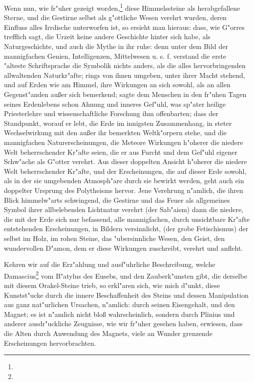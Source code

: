 \documentclass[a4paper, 11pt, oneside, polutonikogreek, german]{article}
\begin{document}
Wenn nun, wie fr"uher gezeigt worden,\footnote{} diese Himmelssteine als herabgefallene Sterne, und die Gestirne selbst als g"ottliche Wesen verehrt wurden, deren Einfluss alles Irrdische unterworfen ist, so ersieht man hieraus: dass, wie G"orres trefflich sagt, die Urzeit keine andere Geschichte hinter sich habe, als Naturgeschichte, und auch die Mythe in ihr ruhe: denn unter dem Bild der mannigfachen Genien, Intelligenzen, Mittelwesen u. s. f. verstand die erste "alteste Schriftsprache die Symbolik nichts anders, als die alles hervorbringenden allwaltenden Naturkr"afte; rings von ihnen umgeben, unter ihrer Macht stehend, und auf Erden wie am Himmel, ihre Wirkungen an sich sowohl, als an allen Gegenst"anden außer sich bemerkend; sagte dem Menschen in den fr"uhen Tagen seines Erdenlebens schon Ahnung und inneres Gef"uhl, was sp"ater heilige Priesterlehre und wissenschaftliche Forschung ihm offenbarten; dass der Standpunkt, worauf er lebt, die Erde im innigsten Zusammenhang, in steter Wechselwirkung mit den außer ihr bemerkten Weltk"orpern stehe, und die mannigfachen Naturerscheinungen, die Meteore Wirkungen h"oherer die niedere Welt beherrschender Kr"afte seien, die er aus Furcht und dem Gef"uhl eigener Schw"ache als G"otter verehrt. Aus dieser doppelten Ansicht h"oherer die niedere Welt beherrschender Kr"afte, und der Erscheinungen, die auf dieser Erde sowohl, als in der sie umgebenden Atmosph"are durch sie bewirkt werden, geht auch ein doppelter Ursprung des Polytheisms hervor. Jene Verehrung n"amlich, die ihren Blick himmelw"arts schwingend, die Gestirne und das Feuer als allgemeines Symbol ihrer allbelebenden Lichtnatur verehrt (der Sab"aism) dann die niedere, die mit der Erde sich nur befassend, alle mannigfachen, durch unsichtbare Kr"afte entstehenden Erscheinungen, in Bildern versinnlicht, (der grobe Fetischismus) der selbst im Holz, im rohen Steine, das "ubersinnliche Wesen, den Geist, den wundervollen D"amon, dem er diese Wirkungen zuschreibt, verehrt und anfleht.

Kehren wir auf die Erz"ahlung und ausf"uhrliche Beschreibung, welche Damascius\footnote{} vom B"atylus des Eusebs, und den Zauberk"unsten gibt, die derselbe mit diesem Orakel-Steine trieb, so erkl"aren sich, wie mich d"unkt, diese Kunstst"ucke durch die innere Beschaffenheit des Steins und dessen Manipulation aus ganz nat"urlichen Ursachen, n"amlich: durch seinen Eisengehalt, und den Magnet; es ist n"amlich nicht bloß wahrscheinlich, sondern durch Plinius und anderer ausdr"uckliche Zeugnisse, wie wir fr"uher gesehen haben, erwiesen, dass die Alten durch Anwendung des Magnets, viele an Wunder grenzende Erscheinungen hervorbrachten.
\end{document}
